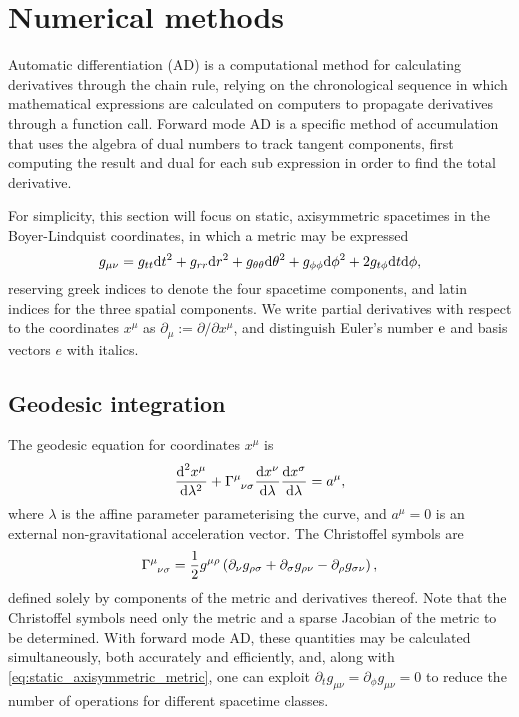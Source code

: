 \section{Numerical methods}

Automatic differentiation (AD) is a computational method for calculating derivatives through the chain rule, relying on the chronological sequence in which mathematical expressions are calculated on computers to propagate derivatives through a function call. Forward mode AD is a specific method of accumulation that uses the algebra of dual numbers to track tangent components, first computing the result and dual for each sub expression in order to find the total derivative.

For simplicity, this section will focus on static, axisymmetric spacetimes in the Boyer-Lindquist coordinates, in which a metric may be expressed
\begin{equation}
\label{eq:static_axisymmetric_metric}
    g_{\mu\nu} 
    = g_{tt} \text{d} t^2 
    + g_{rr} \text{d} r^2 
    + g_{\theta\theta} \text{d} \theta^2 
    + g_{\phi\phi} \text{d} \phi^2 
    + 2g_{t\phi} \text{d} t \text{d} \phi, 
\end{equation}
reserving greek indices to denote the four spacetime components, and latin indices for the three spatial components. We write partial derivatives with respect to the coordinates $x^\mu$ as $\partial_\mu := \partial / \partial x^\mu$, and distinguish Euler's number $\text{e}$ and basis vectors $e$ with italics.


\subsection{Geodesic integration}

The geodesic equation for coordinates $x^\mu$ is
\begin{equation}
\label{eq:geodesic_equation}
    \frac{\d^2 x^\mu}{\d \lambda^2}
    + \utensor{\Gamma}{\mu}{\nu\sigma}
    \frac{\d x^\nu}{\d \lambda}
    \frac{\d x^\sigma}{\d \lambda}
    = a^\mu,
\end{equation}
where $\lambda$ is the affine parameter parameterising the curve, and $a^\mu = 0$ is an external non-gravitational acceleration vector. The Christoffel symbols are
\begin{equation}
    \utensor{\Gamma}{\mu}{\nu\sigma}
    = \frac{1}{2} g^{\mu\rho} 
    \left(
        \partial_{\nu}g_{\rho \sigma}
        + \partial_{\sigma}g_{\rho \nu}
        - \partial_{\rho}g_{\sigma \nu}
    \right),
\end{equation}
defined solely by components of the metric and derivatives thereof. Note that the Christoffel symbols need only the metric and a sparse Jacobian of the metric to be determined. With forward mode AD, these quantities may be calculated simultaneously, both accurately and efficiently, and, along with \eqref{eq:static_axisymmetric_metric}, one can exploit $\partial_t g_{\mu\nu} = \partial_\phi g_{\mu\nu} = 0$ to reduce the number of operations for different spacetime classes.

